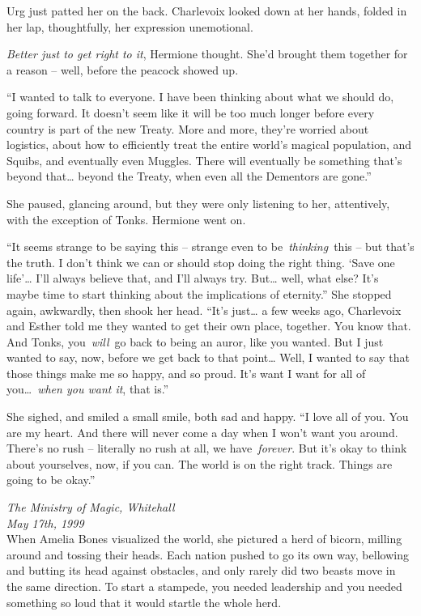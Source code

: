 Urg just patted her on the back. Charlevoix looked down at her hands,
folded in her lap, thoughtfully, her expression unemotional.

\emph{Better just to get right to it}, Hermione thought. She'd brought
them together for a reason -- well, before the peacock showed up.

``I wanted to talk to everyone. I have been thinking about what we
should do, going forward. It doesn't seem like it will be too much
longer before every country is part of the new Treaty. More and more,
they're worried about logistics, about how to efficiently treat the
entire world's magical population, and Squibs, and eventually even
Muggles. There will eventually be something that's beyond that\ldots{}
beyond the Treaty, when even all the Dementors are gone.''

She paused, glancing around, but they were only listening to her,
attentively, with the exception of Tonks. Hermione went on.

``It seems strange to be saying this -- strange even to
be~\emph{thinking}~this -- but that's the truth. I don't think we can or
should stop doing the right thing. `Save one life'\ldots{} I'll always
believe that, and I'll always try. But\ldots{} well, what else? It's
maybe time to start thinking about the implications of eternity.'' She
stopped again, awkwardly, then shook her head. ``It's just\ldots{} a few
weeks ago, Charlevoix and Esther told me they wanted to get their own
place, together. You know that. And Tonks, you~\emph{will}~go back to
being an auror, like you wanted. But I just wanted to say, now, before
we get back to that point\ldots{} Well, I wanted to say that those
things make me so happy, and so proud. It's want I want for all of
you\ldots~\emph{when you want it}, that is.''

She sighed, and smiled a small smile, both sad and happy. ``I love all
of you. You are my heart. And there will never come a day when I won't
want you around. There's no rush -- literally no rush at all, we
have~\emph{forever}. But it's okay to think about yourselves, now, if
you can. The world is on the right track. Things are going to be okay.''

\mybreak

\emph{The Ministry of Magic, Whitehall}\\
\emph{May 17th, 1999}\\

When Amelia Bones visualized the world, she pictured a herd of bicorn,
milling around and tossing their heads. Each nation pushed to go its own
way, bellowing and butting its head against obstacles, and only rarely
did two beasts move in the same direction. To start a stampede, you
needed leadership and you needed something so loud that it would startle
the whole herd.

